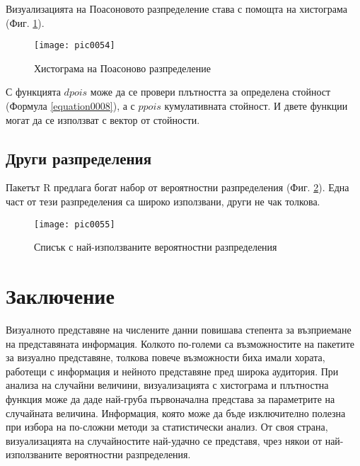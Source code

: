 Визуализацията на Поасоновото разпределение става с помощта на хистограма (Фиг. \ref{figure0054}).

\begin{figure}[h!]
  \centering
  \texttt{[image: pic0054]}
  \caption{Хистограма на Поасоново разпределение}
\label{figure0054}
\end{figure}
\FloatBarrier

С функцията $dpois$ може да се провери плътността за определена стойност (Формула \ref{equation0008}), а с $ppois$ кумулативната стойност. И двете функции могат да се използват с вектор от стойности. 

\subsection{Други разпределения}

Пакетът R предлага богат набор от вероятностни разпределения (Фиг. \ref{figure0055}). Една част от тези разпределения са широко използвани, други не чак толкова.

\begin{figure}[h!]
  \centering
  \texttt{[image: pic0055]}
  \caption{Списък с най-използваните вероятностни разпределения}
\label{figure0055}
\end{figure}
\FloatBarrier

\section*{Заключение}

Визуалното представяне на числените данни повишава степента за възприемане на представяната информация. Колкото по-големи са възможностите на пакетите за визуално представяне, толкова повече възможности биха имали хората, работещи с информация и нейното представяне пред широка аудитория. При анализа на случайни величини, визуализацията с хистограма и плътностна функция може да даде най-груба първоначална представа за параметрите на случайната величина. Информация, която може да бъде изключително полезна при избора на по-сложни методи за статистически анализ. От своя страна, визуализацията на случайностите най-удачно се представя, чрез някои от най-използваните вероятностни разпределения. 

